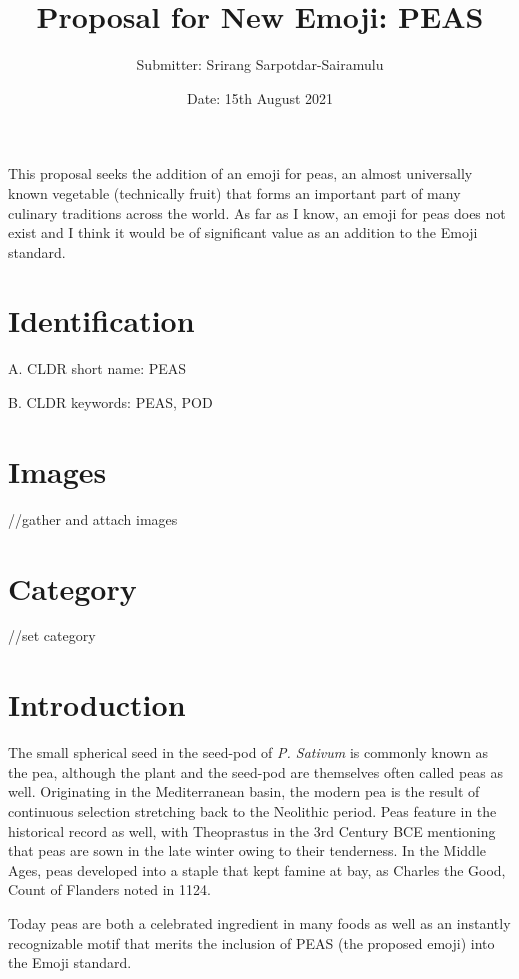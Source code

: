 \documentclass[oneside]{article}
\author{Submitter: Srirang Sarpotdar-Sairamulu}
\title{Proposal for New Emoji: PEAS}
\date{Date: 15th August 2021}
\begin{document}
\renewcommand{\thesubsection}{\thesection.\Alph{subsection}}
\renewcommand{\thesubsubsection}{\thesubsection.\alph{subsubsection}}
\maketitle

\tableofcontents
\label{contents}
\newpage

\abstract
This proposal seeks the addition of an emoji for peas, an almost universally
known vegetable (technically fruit) that forms an important part of many
culinary traditions across the world. As far as I know, an emoji for peas does
not exist and I think it would be of significant value as an addition to the
Emoji standard.

\section{Identification}
A.  CLDR short name: PEAS

\noindent
B.  CLDR keywords: PEAS, POD

\section{Images}
//gather and attach images

\section{Category}
//set category

\section{Introduction}
The small spherical seed in the seed-pod of \textit{P. Sativum} is commonly known
as the pea, although the plant and the seed-pod are themselves often called
peas as well. Originating in the Mediterranean basin, the modern pea is the
result of continuous selection stretching back to the Neolithic period. Peas
feature in the historical record as well, with Theoprastus in the 3rd Century
BCE mentioning that peas are sown in the late winter owing to their tenderness.
In the Middle Ages, peas developed into a staple that kept famine at bay, as
Charles the Good, Count of Flanders noted in 1124.

Today peas are both a celebrated ingredient in many foods as well as an instantly recognizable motif that merits the inclusion of PEAS (the proposed emoji) into the Emoji standard.
\end{document}
